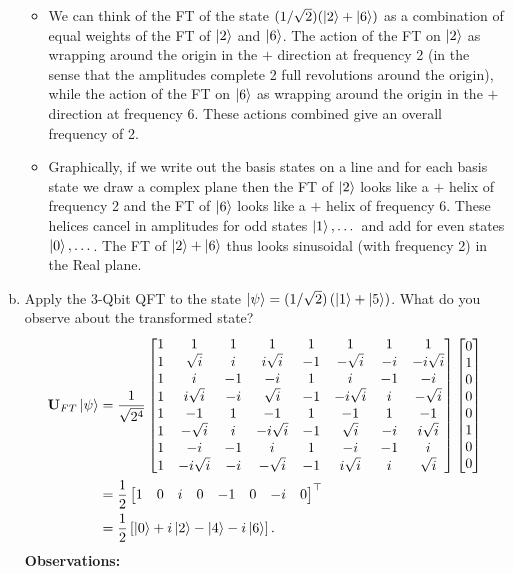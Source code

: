 \documentclass{book}
\theoremstyle{definition}
\newcommand{\nn}{\nonumber}
\newcommand{\f}[2]{\frac{#1}{#2}}
\newcommand{\lp}{\left(}
\newcommand{\rp}{\right)}
\newcommand{\lb}{\left[}
\newcommand{\rb}{\right]}
\newcommand{\lc}{\left\{}
\newcommand{\rc}{\right\}}
\newcommand{\U}{\mathbf{U}}
\begin{document}
\begin{enumerate}[(a)]
\begin{itemize}
	
	\item We can think of the FT of the state $(1/\sqrt{2})(\ket{2} + \ket{6})$ as a combination of equal weights of the FT of $\ket{2}$ and $\ket{6}$. The action of the FT on $\ket{2}$ as wrapping around the origin in the $+$ direction at frequency 2 (in the sense that the amplitudes complete 2 full revolutions around the origin), while the action of the FT on $\ket{6}$ as wrapping around the origin in the $+$ direction at frequency 6. These actions combined give an overall frequency of 2.   
	
	\item Graphically, if we write out the basis states on a line and for each basis state we draw a complex plane then the FT of $\ket{2}$ looks like a $+$ helix of frequency 2 and the FT of $\ket{6}$ looks like a $+$ helix of frequency 6. These helices cancel in amplitudes for odd states $\ket{1},\dots$ and add for even states $\ket{0},\dots$. The FT of $\ket{2} + \ket{6}$ thus looks sinusoidal (with frequency 2) in the Real plane.   
	
	\end{itemize}
	
	\newpage
	
	
	
	\item Apply the 3-Qbit QFT to the state $\ket{\psi} = (1/\sqrt{2})\lp \ket{1} + \ket{5} \rp$. What do you observe about the transformed state?
	\begin{align}
	\U_{FT}\ket{\psi} &= \f{1}{\sqrt{2^4}}\begin{bmatrix}
	1 & 1 & 1 & 1 & 1 & 1 & 1 & 1\\
	1 &\sqrt{i}&i&i\sqrt{i}&-1&-\sqrt{i}&-i&-i\sqrt{i}\\
	1&i&-1&-i&1&i&-1&-i\\
	1&i\sqrt{i}&-i&\sqrt{i}&-1&-i\sqrt{i}&i&-\sqrt{i}\\
	1 & -1 & 1 & -1 & 1 & -1 & 1 & -1\\
	1&-\sqrt{i}&i&-i\sqrt{i}&-1&\sqrt{i}&-i&i\sqrt{i}\\
	1&-i&-1&i&1&-i&-1&i\\
	1&-i\sqrt{i}&-i&-\sqrt{i}&-1&i\sqrt{i}&i&\sqrt{i}
	\end{bmatrix}
	\begin{bmatrix}
	0\\1\\0\\0\\0\\1\\0\\0
	\end{bmatrix}\nn\\
	&= \f{1}{{2}}\begin{bmatrix}
	1&0&i&0&-1&0&-i&0
	\end{bmatrix}^\top\nn\\
	&= \f{1}{2}\lb \ket{0} + i\ket{2} - \ket{4} - i\ket{6} \rb.
	\end{align}
	\textbf{Observations:} 
	

\end{enumerate}
\end{document}
